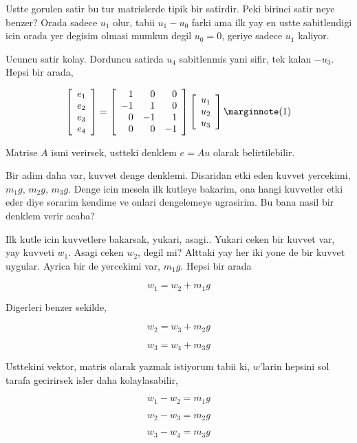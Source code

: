 \documentclass[12pt,fleqn]{article}\usepackage{../../common}
\begin{document}
Ustte gorulen satir bu tur matrislerde tipik bir satirdir. Peki birinci
satir neye benzer? Orada sadece $u_1$ olur, tabii $u_1 - u_0$ farki
ama ilk yay en ustte sabitlendigi icin orada yer degisim olmasi mumkun
degil $u_0 = 0$, geriye sadece $u_1$ kaliyor.

Ucuncu satir kolay. Dorduncu satirda $u_4$ sabitlenmis yani sifir,
tek kalan $-u_3$. Hepsi bir arada,

$$
\left[\begin{array}{c}
e_1 \\ e_2 \\ e_3 \\ e_4
\end{array}\right] =
\left[\begin{array}{rrrr}
1 & 0 & 0 \\ -1 & 1 & 0 \\ 0 & -1 & 1 \\ 0 & 0 & -1
\end{array}\right]
\left[\begin{array}{c}
u_1 \\ u_2 \\ u_3 
\end{array}\right]
\mlabel{1}
$$

Matrise $A$ ismi verirsek, ustteki denklem $e = A u $ olarak belirtilebilir.

Bir adim daha var, kuvvet denge denklemi. Disaridan etki eden kuvvet yercekimi,
$m_1 g$, $m_2 g$, $m_3 g$. Denge icin mesela ilk kutleye bakarim, ona hangi
kuvvetler etki eder diye sorarim kendime ve onlari dengelemeye ugrasirim.
Bu bana nasil bir denklem verir acaba?

Ilk kutle icin kuvvetlere bakarsak, yukari, asagi.. Yukari ceken bir kuvvet
var, yay kuvveti $w_1$. Asagi ceken $w_2$, degil mi? Alttaki yay her iki
yone de bir kuvvet uygular. Ayrica bir de yercekimi var, $m_1 g$. Hepsi bir
arada

$$
w_1 = w_2 + m_1 g
$$

Digerleri benzer sekilde,

$$
w_2 = w_3 + m_2 g
$$

$$
w_3 = w_4 + m_3 g
$$

Usttekini vektor, matris olarak yazmak istiyorum tabii ki, $w$'larin
hepsini sol tarafa gecirirsek isler daha kolaylasabilir,


$$
w_1 - w_2 = m_1 g
$$

$$
w_2 - w_3 = m_2 g
$$

$$
w_3 - w_4 = m_3 g
$$
\end{document}
